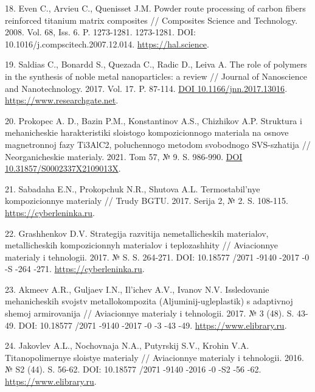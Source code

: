 \begin{references}
18. Even C., Arvieu C., Quenisset J.M. Powder route processing of
carbon fibers reinforced titanium matrix composites // Composites
Science and Technology. 2008. Vol. 68,
Iss. 6. P. 1273-1281. 1273-1281. DOI: 10.1016/j.compscitech.2007.12.014. \href{https://hal.science/hal-00550280/document}{https://hal.science}.

19. Saldias C., Bonardd S., Quezada C., Radic D., Leiva A. The role of
polymers in the synthesis of noble metal nanoparticles: a review //
Journal of Nanoscience and
Nanotechnology. 2017. Vol. 17. P. 87-114. \href{http://dx.doi.org/10.1166/jnn.2017.13016}{DOI 10.1166/jnn.2017.13016}. \href{https://www.researchgate.net/publication/302927159_The_Role_of_Polymers_in_the_Synthesis_of_Noble_Metal_Nanoparticles_A_Review}{https://www.researchgate.net}.

20. Prokopec A. D., Bazin P.M., Konstantinov A.S., Chizhikov
A.P. Struktura i mehanicheskie harakteris\-tiki sloistogo
kompozicionnogo materiala na osnove magnetronnoj fazy Ti3AlC2,
poluchennogo metodom svobodnogo SVS-szhatija // Neorganicheskie
materialy. 2021. Tom 57, №
9. S. 986-990. \href{https://doi.org/10.31857/S0002337X2109013X}{DOI \\10.31857/S0002337X2109013X}.

21. Sabadaha E.N., Prokopchuk N.R., Shutova A.L. Termostabil'nye
kompozicionnye materialy // Trudy BGTU. 2017. Serija 2, №
2. S. 108-115. \href{https://cyberleninka.ru/article/n/termostabilnye-kompozitsionnye-materialy/viewer}{https://cyberleninka.ru}.

22. Grashhenkov D.V. Strategija razvitija nemetallicheskih materialov,
metallicheskih kompozicionnyh materialov i teplozashhity //
Aviacionnye materialy i tehnologii. 2017. № S. S. 264-271. DOI:
10.18577 /2071 -9140 -2017 -0 -S -264
-271. \href{https://cyberleninka.ru/article/n/strategiya-razvitiya-nemetallicheskih-materialov-metallicheskih-kompozitsionnyh-materialov-i-teplozaschity?ysclid=m82pcgt3m5269227216}{https://cyberleninka.ru}.

23. Akmeev A.R., Guljaev I.N., Il'ichev A.V., Ivanov N.V. Issledovanie
mehanicheskih svojstv metallok\-ompozita (Aljuminij-ugleplastik) s
adaptivnoj shemoj armirovanija // Aviacionnye materialy i
tehnologii. 2017. № 3 (48). S. 43-49. DOI: 10.18577 /2071 -9140 -2017
-0 -3 -43
-49. \href{https://www.elibrary.ru/item.asp?id=29728812&ysclid=m87lxlwmk6845840919}{https://www.elibrary.ru}.

24. Jakovlev A.L., Nochovnaja N.A., Putyrskij S.V., Krohin
V.A. Titanopolimernye sloistye materialy // Aviacionnye materialy i
tehnologii. 2016. № S2 (44). S. 56-62. DOI: 10.18577 /2071 -9140 -2016
-0 -S2 -56
-62. \href{https://www.elibrary.ru/item.asp?id=27022904&ysclid=m87m1shkiq269457456}{https://www.elibrary.ru}.


\end{references}
